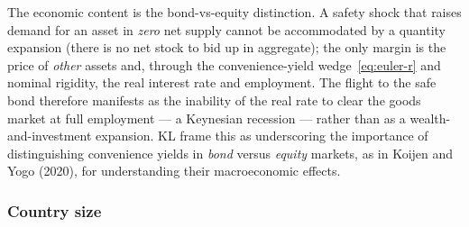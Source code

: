 The economic content is the bond-vs-equity distinction. A safety shock that raises
demand for an asset in \emph{zero} net supply cannot be accommodated by a quantity
expansion (there is no net stock to bid up in aggregate); the only margin is the
price of \emph{other} assets and, through the convenience-yield
wedge~\eqref{eq:euler-r} and nominal rigidity, the real interest rate and
employment. The flight to the safe bond therefore manifests as the inability of
the real rate to clear the goods market at full employment --- a Keynesian
recession --- rather than as a wealth-and-investment expansion. KL frame this as
underscoring the importance of distinguishing convenience yields in \emph{bond}
versus \emph{equity} markets, as in Koijen and Yogo (2020), for understanding
their macroeconomic effects.

\subsubsection{Country size}
\label{sec:country-size}

